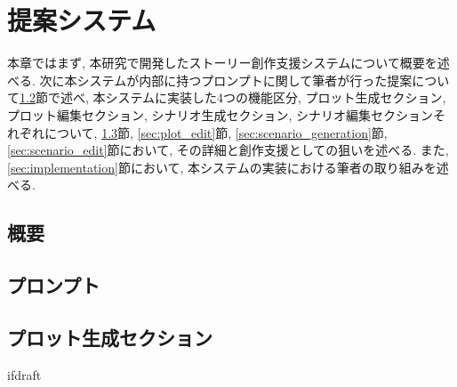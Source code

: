 \documentclass[a4j,12pt]{jsreport}
\begin{document}
\pagestyle{fancy}
\lhead{\rightmark}
\renewcommand{\chaptermark}[1]{\markboth{第\ \thechapter\ 章\ #1}{}}
\fi

\chapter{提案システム}\label{chap:proposedmethod}
本章ではまず, 本研究で開発したストーリー創作支援システムについて概要を述べる. 次に本システムが内部に持つプロンプトに関して筆者が行った提案について\ref{sec:prompt}節で述べ, 本システムに実装した4つの機能区分, プロット生成セクション, プロット編集セクション, シナリオ生成セクション, シナリオ編集セクションそれぞれについて, \ref{sec:plot_generation}節, \ref{sec:plot_edit}節, \ref{sec:scenario_generation}節, \ref{sec:scenario_edit}節において, その詳細と創作支援としての狙いを述べる. また, \ref{sec:implementation}節において, 本システムの実装における筆者の取り組みを述べる.

\section{概要}\label{sec:outline04}


\section{プロンプト}\label{sec:prompt}

\section{プロット生成セクション}\label{sec:plot_generation}



\expandafter\ifx\csname ifdraft\endcsname\relax
   \fancyhead[LO]{}
   \printbibliography[title=参考文献]
   
\end{document}
